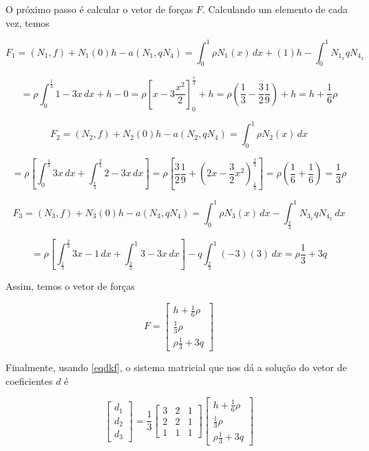 \documentclass[12pt]{scrartcl}
\begin{document}
\endgroup

O próximo passo é calcular o vetor de forças $F$. Calculando um elemento de cada vez, temos

\[
    F_1 = (N_1, f) + N_1(0)h - a\left(N_1, qN_4\right) = 
    \int_{0}^{1} \rho N_1(x) \, dx + (1)h - \int_{0}^{1} N_{1_x} qN_{4_x} 
\]

\[
    = \rho \int_{0}^{\frac{1}{3}}  1 - 3x \, dx + h - 0 = \rho \left[x - 3\frac{x^2}{2}\right]_{0}^{\frac{1}{3}} + h
     = \rho \left(\frac{1}{3} - \frac{3}{2}\frac{1}{9}\right) + h = h + \frac{1}{6}\rho
\]

\[
    F_2 = (N_2, f) + N_2(0)h - a\left(N_2, qN_4\right) = 
    \int_{0}^{1} \rho N_2(x) \, dx
\]

\[
    = \rho \left[\int_{0}^{\frac{1}{3}}  3x \, dx  + \int_{\frac{1}{3}}^{\frac{2}{3}}  2 - 3x \, dx\right] =
    \rho \left[\frac{3}{2}\frac{1}{9} + \left(2x - \frac{3}{2}x^2\right)_{\frac{1}{3}}^{\frac{2}{3}}  \right]
    = \rho \left(\frac{1}{6} + \frac{1}{6}\right) = \frac{1}{3}\rho 
\]

\[
    F_3 = (N_3, f) + N_3(0)h - a\left(N_3, qN_4\right) = 
    \int_{0}^{1} \rho N_3(x) \, dx - \int_{\frac{2}{3}}^{1} N_{3_x} qN_{4_x} \, dx 
\]

\[
    = \rho \left[\int_{\frac{1}{3}}^{\frac{2}{3}}  3x - 1 \, dx  + \int_{\frac{2}{3}}^{1}  3 - 3x \, dx\right] - q\int_{\frac{2}{3}}^{1} (-3) (3) \, dx =
    \rho \frac{1}{3} + 3q
\]

Assim, temos o vetor de forças

\begingroup
\renewcommand*{\arraystretch}{2}

\[
    F =
    \begin{bmatrix}
        h + \frac{1}{6}\rho    \\
        \frac{1}{3}\rho    \\
        \rho \frac{1}{3} + 3q
    \end{bmatrix}
\]

\endgroup

Finalmente, usando \eqref{eqdkf}, o sistema matricial que nos dá a solução do vetor de coeficientes $d$ é

\begingroup
\renewcommand*{\arraystretch}{2}

\[
    \begin{bmatrix}
        d_1    \\
        d_2    \\
        d_3
    \end{bmatrix} =
    \frac{1}{3}
    \begin{bmatrix}
        3  & 2 & 1  \\
        2 & 2  & 1 \\
        1  & 1 & 1
    \end{bmatrix}
    \begin{bmatrix}
        h + \frac{1}{6}\rho    \\
        \frac{1}{3}\rho    \\
        \rho \frac{1}{3} + 3q
    \end{bmatrix}
\]
\end{document}
